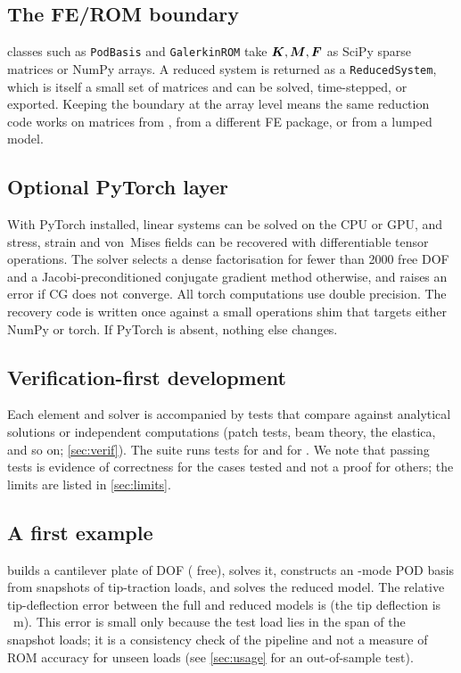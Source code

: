 \subsection{The FE/ROM boundary}
\rom{} classes such as \texttt{PodBasis} and \texttt{GalerkinROM} take $\bm{K},\bm{M},\bm{F}$ as SciPy sparse matrices or NumPy arrays.
A reduced system is returned as a \texttt{ReducedSystem}, which is itself a small set of matrices and can be solved, time-stepped,
or exported. Keeping the boundary at the array level means the same reduction code works on matrices from \fea{}, from a different
FE package, or from a lumped model.

\subsection{Optional PyTorch layer}
With PyTorch installed, linear systems can be solved on the CPU or GPU, and stress, strain and von~Mises fields can be recovered with
differentiable tensor operations. The solver selects a dense factorisation for fewer than 2000 free DOF and a Jacobi-preconditioned
conjugate gradient method otherwise, and raises an error if CG does not converge. All torch computations use double precision.
The recovery code is written once against a small operations shim that targets either NumPy or torch.
If PyTorch is absent, nothing else changes.

\subsection{Verification-first development}
Each element and solver is accompanied by tests that compare against analytical solutions or independent computations
(patch tests, beam theory, the elastica, and so on; \cref{sec:verif}). The suite runs \feaTests{} tests for \fea{} and \romTests{}
for \rom{}. We note that passing tests is evidence of correctness for the cases tested and not a proof for others; the limits are
listed in \cref{sec:limits}.

\subsection{A first example}
 builds a cantilever plate of \qsDof{} DOF (\qsFree{} free), solves it, constructs an \qsModes{}-mode POD basis from
snapshots of tip-traction loads, and solves the reduced model. The relative tip-deflection error between the full and reduced
models is \qsErr{} (the tip deflection is \qsTip{}~m). This error is small only because the test load lies in the span of
the snapshot loads; it is a consistency check of the pipeline and not a measure of ROM accuracy for unseen loads (see
\cref{sec:usage} for an out-of-sample test).


